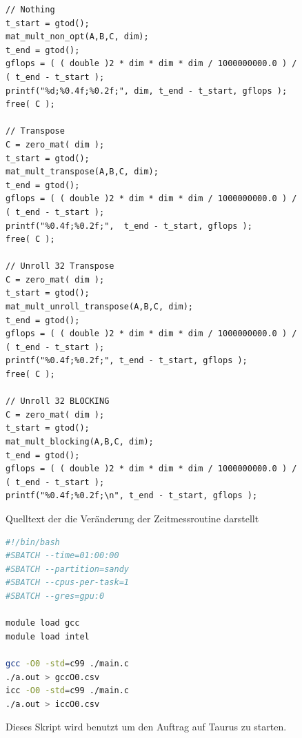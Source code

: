 \lstset{language=c}
\begin{figure}[h]
\begin{lstlisting}
// Nothing
t_start = gtod();
mat_mult_non_opt(A,B,C, dim);
t_end = gtod();
gflops = ( ( double )2 * dim * dim * dim / 1000000000.0 ) / ( t_end - t_start );
printf("%d;%0.4f;%0.2f;", dim, t_end - t_start, gflops );
free( C );

// Transpose
C = zero_mat( dim );
t_start = gtod();
mat_mult_transpose(A,B,C, dim);
t_end = gtod();
gflops = ( ( double )2 * dim * dim * dim / 1000000000.0 ) / ( t_end - t_start );
printf("%0.4f;%0.2f;",  t_end - t_start, gflops );
free( C );

// Unroll 32 Transpose
C = zero_mat( dim );
t_start = gtod();
mat_mult_unroll_transpose(A,B,C, dim);
t_end = gtod();
gflops = ( ( double )2 * dim * dim * dim / 1000000000.0 ) / ( t_end - t_start );
printf("%0.4f;%0.2f;", t_end - t_start, gflops );
free( C );

// Unroll 32 BLOCKING
C = zero_mat( dim );
t_start = gtod();
mat_mult_blocking(A,B,C, dim);
t_end = gtod();
gflops = ( ( double )2 * dim * dim * dim / 1000000000.0 ) / ( t_end - t_start );
printf("%0.4f;%0.2f;\n", t_end - t_start, gflops );
\end{lstlisting}
\caption{Quelltext der die Veränderung der Zeitmessroutine darstellt}
\label{figureZeitmessung}
\end{figure}



\begin{figure}
\begin{lstlisting}[language=bash]
#!/bin/bash
#SBATCH --time=01:00:00
#SBATCH --partition=sandy
#SBATCH --cpus-per-task=1
#SBATCH --gres=gpu:0

module load gcc
module load intel

gcc -O0 -std=c99 ./main.c
./a.out > gccO0.csv
icc -O0 -std=c99 ./main.c
./a.out > iccO0.csv
\end{lstlisting}
\caption{Dieses Skript wird benutzt um den Auftrag auf Taurus zu starten.}
\label{FigureSkript}
\end{figure}



